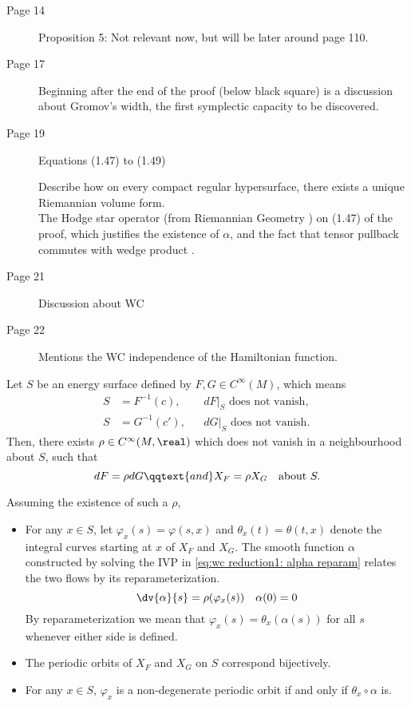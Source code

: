 \documentclass[../main-v2-manifolds.tex]{subfiles}
\begin{document}
\begin{description}
\item[Page 14]
Proposition 5: Not relevant now, but will be later around page 110.

\item[Page 17]
Beginning after the end of the proof (below black square) is a discussion about Gromov's width, the first symplectic capacity to be discovered.

\item[Page 19]
Equations (1.47) to (1.49)

Describe how on every compact regular hypersurface, there exists a unique Riemannian volume form.\\

The Hodge star operator (from Riemannian Geometry \cite{Lee2019Introduction}) on (1.47) of the proof, which justifies the existence of $\alpha$, and the fact that tensor pullback commutes with wedge product \cite{Lee2013Introduction}.
\item[Page 21]
Discussion about WC

\item[Page 22]
Mentions the WC independence of the Hamiltonian function. 
\end{description}
\begin{wts}
    Let $S$ be an energy surface defined by $F, G\in C^\infty(M)$, which means
    \begin{align*}
        S &= F^{-1}(c), &  &dF\vert_S\text{ does not vanish, }\\
        S &= G^{-1}(c'), & &dG\vert_S\text{ does not vanish.}
    \end{align*}
    Then, there exists $\rho\in C^\infty(M,\real)$ which does not vanish in a neighbourhood about $S$, such that
    \[
        dF = \rho dG\qqtext{and}X_F = \rho X_G\quad\text{about }S.
    \]
\end{wts}
 \begin{wts}
        Assuming the existence of such a $\rho$, 
    \begin{itemize}
        \item For any $x\in S$, let $\varphi_x(s) = \varphi(s,x)$ and $\theta_x(t) = \theta(t,x)$ denote the integral curves starting at $x$ of $X_F$ and $X_G$. The smooth function $\alpha$ constructed by solving the IVP in \cref{eq:wc reduction1: alpha reparam} relates the two flows by its reparameterization.
        \begin{equation}
            \dv{\alpha}{s} = \rho(\varphi_x(s))\quad\alpha(0)=0
            \label{eq:wc reduction1: alpha reparam}
        \end{equation}
        By reparameterization we mean that $\varphi_x(s) = \theta_x(\alpha(s))$ for all $s$ whenever either side is defined.
        \item The periodic orbits of $X_{F}$ and $X_G$ on $S$ correspond bijectively.
        \item For any $x\in S$, $\varphi_x$ is a non-degenerate periodic orbit if and only if $\theta_x\circ\alpha$ is.
    \end{itemize}
\end{wts}
\end{document}
